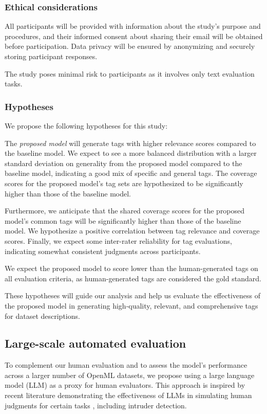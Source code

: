 \subsubsection{Ethical considerations}
All participants will be provided with information about the study's purpose and procedures, and their informed consent about sharing their email will be obtained before participation. Data privacy will be ensured by anonymizing and securely storing participant responses.

The study poses minimal risk to participants as it involves only text evaluation tasks.


\subsubsection{Hypotheses}
We propose the following hypotheses for this study:

The \textit{proposed model} will generate tags with higher relevance scores compared to the baseline model. We expect to see a more balanced distribution with a larger standard deviation on generality from the proposed model compared to the baseline model, indicating a good mix of specific and general tags. The coverage scores for the proposed model's tag sets are hypothesized to be significantly higher than those of the baseline model.

Furthermore, we anticipate that the shared coverage scores for the proposed model's common tags will be significantly higher than those of the baseline model. We hypothesize a positive correlation between tag relevance and coverage scores. Finally, we expect some inter-rater reliability for tag evaluations, indicating somewhat consistent judgments across participants.

We expect the proposed model to score lower than the human-generated tags on all evaluation criteria, as human-generated tags are considered the gold standard.

These hypotheses will guide our analysis and help us evaluate the effectiveness of the proposed model in generating high-quality, relevant, and comprehensive tags for dataset descriptions.

\subsection{Large-scale automated evaluation}
\label{sec:large_scale_evaluation}

To complement our human evaluation and to assess the model's performance across a larger number of OpenML datasets, we propose using a large language model (LLM) as a proxy for human evaluators. This approach is inspired by recent literature demonstrating the effectiveness of LLMs in simulating human judgments for certain tasks \cite{musil_exploring_2024}, including intruder detection.

